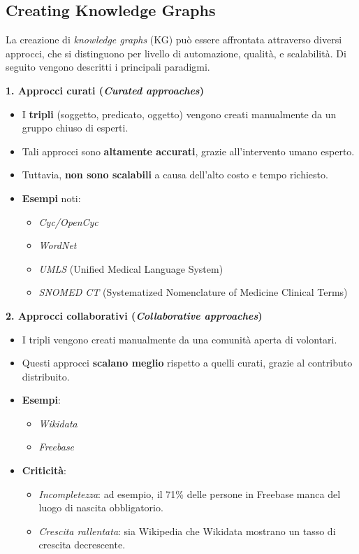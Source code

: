\subsection{Creating Knowledge Graphs}
La creazione di \textit{knowledge graphs} (KG) può essere affrontata attraverso diversi approcci, che si distinguono per livello di automazione, qualità, e scalabilità. Di seguito vengono descritti i principali paradigmi.

\vspace{1em}
\textbf{1. Approcci curati (\textit{Curated approaches})}
\begin{itemize}
  \item I \textbf{tripli} (soggetto, predicato, oggetto) vengono creati manualmente da un gruppo chiuso di esperti.
  \item Tali approcci sono \textbf{altamente accurati}, grazie all'intervento umano esperto.
  \item Tuttavia, \textbf{non sono scalabili} a causa dell'alto costo e tempo richiesto.
  \item \textbf{Esempi} noti:
  \begin{itemize}
    \item \textit{Cyc/OpenCyc}
    \item \textit{WordNet}
    \item \textit{UMLS} (Unified Medical Language System)
    \item \textit{SNOMED CT} (Systematized Nomenclature of Medicine Clinical Terms)
  \end{itemize}
\end{itemize}

\vspace{1em}
\textbf{2. Approcci collaborativi (\textit{Collaborative approaches})}
\begin{itemize}
  \item I tripli vengono creati manualmente da una comunità aperta di volontari.
  \item Questi approcci \textbf{scalano meglio} rispetto a quelli curati, grazie al contributo distribuito.
  \item \textbf{Esempi}:
  \begin{itemize}
    \item \textit{Wikidata}
    \item \textit{Freebase}
  \end{itemize}
  \item \textbf{Criticità}:
  \begin{itemize}
    \item \textit{Incompletezza}: ad esempio, il 71\% delle persone in Freebase manca del luogo di nascita obbligatorio.
    \item \textit{Crescita rallentata}: sia Wikipedia che Wikidata mostrano un tasso di crescita decrescente.
  \end{itemize}
\end{itemize}

